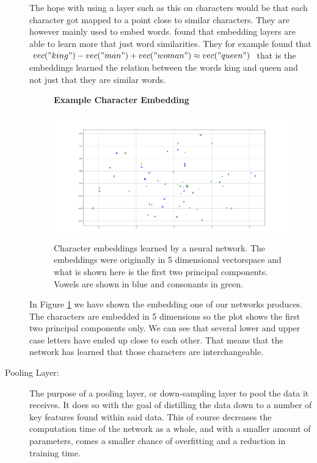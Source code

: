 \begin{description}
        The hope with using a layer such as this on characters would be that
        each character got mapped to a point close to similar characters. They
        are however mainly used to embed words. \citet{mikolov2013linguistic}
        found that embedding layers are able to learn more that just word
        similarities. They for example found that $vec("king") - vec("man") +
        vec("woman") \approx vec("queen")$ that is the embeddings learned the
        relation between the words king and queen and not just that they are
        similar words.

        \begin{figure}
            \centering
            \textbf{Example Character Embedding}\par\medskip
            \includegraphics[width=\textwidth]{./pictures/method/example_character_embeddings.png}
            \caption{Character embeddings learned by a neural network. The
                embeddings were originally in 5 dimensional vectorspace and what
                is shown here is the first two principal components. Vowels are
                shown in blue and consonants in green.}
            \label{fig:embeddings}
        \end{figure}

        In Figure \ref{fig:embeddings} we have shown the embedding one of our
        networks produces. The characters are embedded in 5 dimensions so the
        plot shows the first two principal components only. We can see that
        several lower and upper case letters have ended up close to each other.
        That means that the network has learned that those characters are
        interchangeable.

    \item[Pooling Layer:]

        The purpose of a pooling layer, or down-sampling layer to pool the
        data it receives. It does so with the goal of distilling the data down
        to a number of key features found within said data. This of course
        decreases the computation time of the network as a whole, and with a
        smaller amount of parameters, comes a smaller chance of overfitting and
        a reduction in training time.


\end{description}

